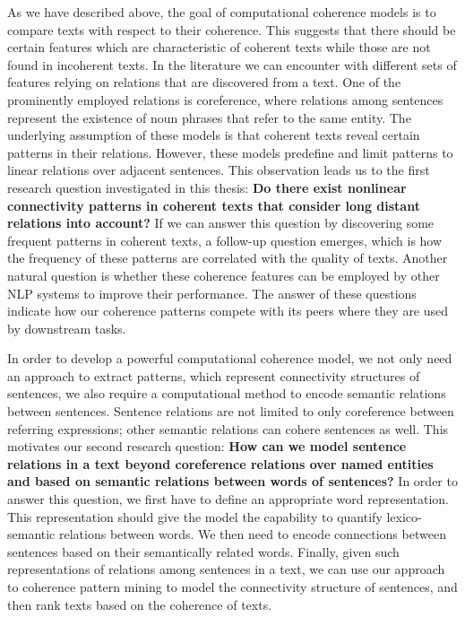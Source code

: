 As we have described above, the goal of computational coherence models is to compare texts with respect to their coherence. 
This suggests that there should be certain features which are characteristic of coherent texts while those are not found in incoherent texts. 
In the literature we can encounter with different sets of features relying on relations that are discovered from a text. 
One of the prominently employed relations is coreference, where relations among sentences represent the existence of noun phrases that refer to the same entity. 
The underlying assumption of these models is that coherent texts reveal certain patterns in their relations. 
However, these models predefine and limit patterns to linear relations over adjacent sentences. 
This observation leads us to the first research question investigated in this thesis: 
\textbf{Do there exist nonlinear connectivity patterns in coherent texts that consider long distant relations into account?} 
If we can answer this question by discovering some frequent patterns in coherent texts, a follow-up question emerges, which is how the frequency of these patterns are correlated with the quality of texts. 
Another natural question is whether these coherence features can be employed by other NLP systems to improve their performance. 
The answer of these questions indicate how our coherence patterns compete with its peers where they are used by downstream tasks. 

In order to develop a powerful computational coherence model, we not only need an approach to extract patterns, which represent connectivity structures of sentences, we also require a computational method to encode semantic relations between sentences. 
Sentence relations are not limited to only coreference between referring expressions; other semantic relations can cohere sentences as well. 
This motivates our second research question: \textbf{How can we model sentence relations in a text beyond coreference relations over named entities and based on semantic relations between words of sentences?}  
In order to answer this question, we first have to define an appropriate word representation.  
This representation should give the model the capability to quantify lexico-semantic relations between words. 
We then need to encode connections between sentences based on their semantically related words.
Finally, given such representations of relations among sentences in a text, we can use our approach to coherence pattern mining to model the connectivity structure of sentences, and then rank texts based on the coherence of texts. 

